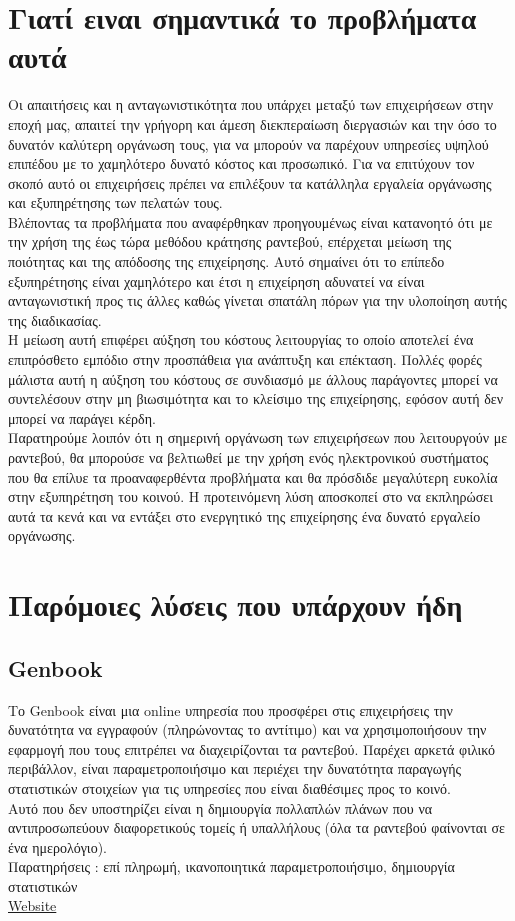 \documentclass[12pt]{article}
\begin{document}
\section {Γιατί ειναι σημαντικά το προβλήματα αυτά}
Οι απαιτήσεις και η ανταγωνιστικότητα που υπάρχει μεταξύ των επιχειρήσεων στην εποχή μας, απαιτεί την γρήγορη και άμεση διεκπεραίωση διεργασιών και την όσο το δυνατόν καλύτερη οργάνωση τους, για να μπορούν να παρέχουν υπηρεσίες υψηλού επιπέδου με το χαμηλότερο δυνατό κόστος και προσωπικό. Για να επιτύχουν τον σκοπό αυτό οι επιχειρήσεις πρέπει να επιλέξουν τα κατάλληλα εργαλεία οργάνωσης και εξυπηρέτησης των πελατών τους.
\\[0.3cm]
Βλέποντας τα προβλήματα που αναφέρθηκαν προηγουμένως είναι κατανοητό ότι με την χρήση της έως τώρα μεθόδου κράτησης ραντεβού, επέρχεται μείωση της ποιότητας και της απόδοσης της επιχείρησης. Αυτό σημαίνει ότι το επίπεδο εξυπηρέτησης είναι χαμηλότερο και έτσι η επιχείρηση αδυνατεί να είναι ανταγωνιστική προς τις άλλες καθώς γίνεται σπατάλη πόρων για την υλοποίηση αυτής της διαδικασίας.
\\[0.3cm]
Η μείωση αυτή επιφέρει αύξηση του κόστους λειτουργίας το οποίο αποτελεί ένα επιπρόσθετο εμπόδιο στην προσπάθεια για ανάπτυξη και επέκταση. Πολλές φορές μάλιστα αυτή η αύξηση του κόστους σε συνδιασμό με άλλους παράγοντες μπορεί να συντελέσουν στην μη βιωσιμότητα και το κλείσιμο της επιχείρησης, εφόσον αυτή δεν μπορεί να παράγει κέρδη.
\\[0.3cm]
Παρατηρούμε λοιπόν ότι η σημερινή οργάνωση των επιχειρήσεων που λειτουργούν με ραντεβού, θα μπορούσε να βελτιωθεί με την χρήση ενός ηλεκτρονικού συστήματος που θα επίλυε τα προαναφερθέντα προβλήματα και θα πρόσδιδε μεγαλύτερη ευκολία στην εξυπηρέτηση του κοινού. Η προτεινόμενη λύση αποσκοπεί στο να εκπληρώσει αυτά τα κενά και να εντάξει στο ενεργητικό της επιχείρησης ένα δυνατό εργαλείο οργάνωσης.

\section{Παρόμοιες λύσεις που υπάρχουν ήδη}
\subsection{Genbook}
Το Genbook είναι μια online υπηρεσία που προσφέρει στις επιχειρήσεις την δυνατότητα να εγγραφούν (πληρώνοντας το αντίτιμο) και να χρησιμοποιήσουν την εφαρμογή που τους επιτρέπει να διαχειρίζονται τα ραντεβού. Παρέχει αρκετά φιλικό περιβάλλον, είναι παραμετροποιήσιμο και περιέχει την δυνατότητα παραγωγής στατιστικών στοιχείων για τις υπηρεσίες που είναι διαθέσιμες προς το κοινό. 
\\[0.3cm]
Αυτό που δεν υποστηρίζει είναι η δημιουργία πολλαπλών πλάνων που να αντιπροσωπεύουν διαφορετικούς τομείς ή υπαλλήλους (όλα τα ραντεβού φαίνονται σε ένα ημερολόγιο).
\\[0.3cm]
Παρατηρήσεις : επί πληρωμή, ικανοποιητικά παραμετροποιήσιμο, δημιουργία στατιστικών
\\[0.3cm]
\href{http://www.genbook.com}{Website}
\end{document}

